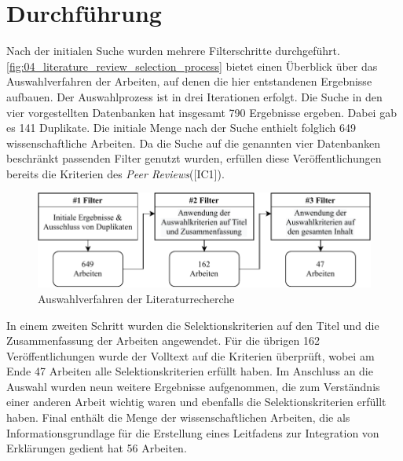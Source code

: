 \section{Durchführung}


Nach der initialen Suche wurden mehrere Filterschritte durchgeführt. \autoref{fig:04_literature_review_selection_process} bietet einen Überblick über das Auswahlverfahren der Arbeiten, auf denen die hier entstandenen Ergebnisse aufbauen. Der Auswahlprozess ist in drei Iterationen erfolgt. Die Suche in den vier vorgestellten Datenbanken hat insgesamt 790 Ergebnisse ergeben. Dabei gab es 141 Duplikate. Die initiale Menge nach der Suche enthielt folglich 649 wissenschaftliche Arbeiten. Da die Suche auf die genannten vier Datenbanken beschränkt passenden Filter genutzt wurden, erfüllen diese Veröffentlichungen bereits die Kriterien des \textit{Peer Reviews}([IC1]).

\begin{figure}[htb]
    \centering
    \includegraphics[width=\textwidth]{contents/04_literature_review/res/selection_process.pdf}
    \caption{Auswahlverfahren der Literaturrecherche}
    \label{fig:04_literature_review_selection_process}
\end{figure}

In einem zweiten Schritt wurden die Selektionskriterien auf den Titel und die Zusammenfassung der Arbeiten angewendet. Für die übrigen 162 Veröffentlichungen wurde der Volltext auf die Kriterien überprüft, wobei am Ende 47 Arbeiten alle Selektionskriterien erfüllt haben. Im Anschluss an die Auswahl wurden neun weitere Ergebnisse aufgenommen, die zum Verständnis einer anderen Arbeit wichtig waren und ebenfalls die Selektionskriterien erfüllt haben. Final enthält die Menge der wissenschaftlichen Arbeiten, die als Informationsgrundlage für die Erstellung eines Leitfadens zur Integration von Erklärungen gedient hat 56 Arbeiten.